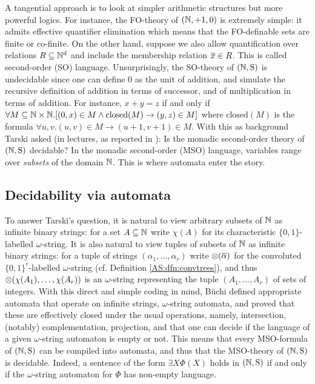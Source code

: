 
A tangential approach is to look at simpler arithmetic structures but more powerful logics. For instance, the FO-theory of $(\mathbb{N},+1,0)$ is extremely simple: it admits effective quantifier elimination which means that the FO-definable sets are finite or co-finite. On the other hand, suppose we also allow quantification over relations $R \subseteq \mathbb{N}^d$ and include the membership relation $\mbox{$\overline {x}$} \in R$.  This is called second-order (SO) language. Unsurprisingly, the SO-theory of $\mbox{$(\mathbb{N},\mathrm{S})$}$ is undecidable since one can define $0$ as the unit of addition, and simulate the recursive definition of addition in terms of successor, and of multiplication in terms of addition. For instance, $x + y = z $ if and only if $\forall M \subseteq \mathbb{N} \times \mathbb{N}. [(0,x) \in M \wedge \text{closed}(M) \to (y,z) \in M]$ where $\text{closed}(M)$ is the formula $\forall u,v. (u,v) \in M \to (u+1,v+1) \in M$. With this as background Tarski asked (in lectures, as reported in \cite{Robi58}): Is the monadic second-order theory of $\mbox{$(\mathbb{N},\mathrm{S})$}$ decidable? In the monadic second-order (MSO) language, variables range over
{\em subsets} of the domain $\mathbb{N}$. This is where automata enter the story.




\subsection{Decidability via automata}

To answer Tarski's question, it is natural to view arbitrary subsets of $\mathbb{N}$ as infinite binary strings: for a set $A \subseteq \mathbb{N}$ write $\chi(A)$ for its characteristic $\{0,1\}$-labelled $\omega$-string. It is also natural to view tuples of subsets of $\mathbb{N}$ as infinite binary strings: for a tuple of strings $(\alpha_1,\dots,\alpha_r)$ write $\otimes(\mbox{$\overline {\alpha}$})$ for the convoluted $\{0,1\}^r$-labelled $\omega$-string (cf. Definition \ref{AS:dfn:convtrees}), and thus $\otimes(\chi(A_1), \dots, \chi(A_r))$ is an $\omega$-string representing the tuple $(A_1,\dots,A_r)$ of sets of integers. With this direct and simple coding in mind, B\"uchi \cite{Buch62} defined appropriate automata that operate on infinite strings, $\omega$-string automata, and proved that these are effectively closed under the usual operations, namely, intersection, (notably) complementation, projection, and that one can decide if the language of a given $\omega$-string automaton is empty or not. This means that every MSO-formula of $\mbox{$(\mathbb{N},\mathrm{S})$}$ can be compiled into automata, and thus that the MSO-theory of $\mbox{$(\mathbb{N},\mathrm{S})$}$ is decidable. Indeed, a sentence of the form $\exists X \Phi(X)$ holds in $\mbox{$(\mathbb{N},\mathrm{S})$}$ if and only if the $\omega$-string automaton for $\Phi$ has non-empty language.


